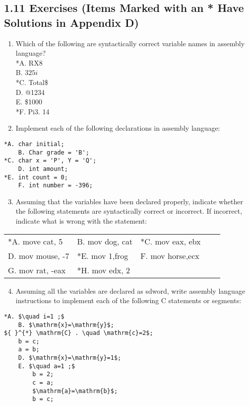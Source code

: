 \documentclass[10pt]{article}
\begin{document}
\subsection*{1.11 Exercises (Items Marked with an * Have Solutions in Appendix D)}
\begin{enumerate}
  \item Which of the following are syntactically correct variable names in assembly language?\\
*A. RX8\\
B. $325 i$\\
*C. Total\$\\
D. @1234\\
E. \$1000\\
*F. Pi3. 14
  \item Implement each of the following declarations in assembly language:
\end{enumerate}

\begin{verbatim}
*A. char initial;
    B. Char grade = 'B';
*C. char x = 'P', Y = 'Q';
    D. int amount;
*E. int count = 0;
    F. int number = -396;
\end{verbatim}

\begin{enumerate}
  \setcounter{enumi}{2}
  \item Assuming that the variables have been declared properly, indicate whether the following statements are syntactically correct or incorrect. If incorrect, indicate what is wrong with the statement:
\end{enumerate}

\begin{center}
\begin{tabular}{lllll}
*A. move cat, 5 & B. mov dog, cat & *C. mov eax, ebx &  \\
D. mov mouse, -7 & *E. mov 1,frog & F. mov horse,ecx &  \\
G. mov rat, -eax & *H. mov edx, 2 &  &  \\
\end{tabular}
\end{center}

\begin{enumerate}
  \setcounter{enumi}{3}
  \item Assuming all the variables are declared as sdword, write assembly language instructions to implement each of the following C statements or segments:
\end{enumerate}

\begin{verbatim}
*A. $\quad i=1 ;$
    B. $\mathrm{x}=\mathrm{y}$;
${ }^{*} \mathrm{C} . \quad \mathrm{c}=2$;
    b = c;
    a = b;
    D. $\mathrm{x}=\mathrm{y}=1$;
    E. $\quad a=1 ;$
        b = 2;
        c = a;
        $\mathrm{a}=\mathrm{b}$;
        b = c;
\end{verbatim}
\end{document}
